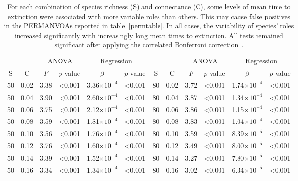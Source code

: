 \documentclass[12pt]{article}
\begin{document}
	\begin{table}[h!]
		\caption{For each combination of species richness (S) and connectance (C), some levels of mean time to extinction were associated with more variable roles than others. This may cause false positives in the PERMANVOAs reported in table~\ref{permtable}. In all cases, the variability of species' roles increased significantly with increasingly long mean times to extinction. All tests remained significant after applying the correlated Bonferroni correction~\citep{Drezner2016}.}
		\label{disptable}
		\footnotesize
		\begin{tabular}{c c | c c| c c ||c c | c c | c c |}
			&		&	\multicolumn{2}{c|}{ANOVA}	&\multicolumn{2}{c||}{Regression} 			& & & 	\multicolumn{2}{c|}{ANOVA}		 	&	 \multicolumn{2}{c|}{Regression} 			\\
            S	&	C	&	$F$	&	$p$-value	&	$\beta$	&	$p$-value	&	S	&	C	&	$F$	&	$p$-value	&	$\beta$	&	$p$-value	\\
			\hline
        50	&	0.02	&	3.38	&	\textless0.001	&	3.36$\times10^{-4}$	&	\textless0.001	&	80	&	0.02	&	3.72	&	\textless0.001	&	1.74$\times10^{-4}$	&	\textless0.001	\\
        50	&	0.04	&	3.90	&	\textless0.001	&	2.60$\times10^{-4}$	&	\textless0.001	&	80	&	0.04	&	3.87	&	\textless0.001	&	1.34$\times10^{-4}$	&	\textless0.001	\\
        50	&	0.06	&	3.75	&	\textless0.001	&	2.12$\times10^{-4}$	&	\textless0.001	&	80	&	0.06	&	3.86	&	\textless0.001	&	1.15$\times10^{-4}$	&	\textless0.001	\\
        50	&	0.08	&	3.59	&	\textless0.001	&	1.81$\times10^{-4}$	&	\textless0.001	&	80	&	0.08	&	3.83	&	\textless0.001	&	1.04$\times10^{-4}$	&	\textless0.001	\\
        50	&	0.10	&	3.56	&	\textless0.001	&	1.76$\times10^{-4}$	&	\textless0.001	&	80	&	0.10	&	3.59	&	\textless0.001	&	8.39$\times10^{-5}$	&	\textless0.001	\\
        50	&	0.12	&	3.76	&	\textless0.001	&	1.60$\times10^{-4}$	&	\textless0.001	&	80	&	0.12	&	3.49	&	\textless0.001	&	8.00$\times10^{-5}$	&	\textless0.001	\\
        50	&	0.14	&	3.39	&	\textless0.001	&	1.52$\times10^{-4}$	&	\textless0.001	&	80	&	0.14	&	3.27	&	\textless0.001	&	7.80$\times10^{-5}$	&	\textless0.001	\\
        50	&	0.16	&	3.34	&	\textless0.001	&	1.34$\times10^{-4}$	&	\textless0.001	&	80	&	0.16	&	3.02	&	\textless0.001	&	6.34$\times10^{-5}$	&	\textless0.001	\\

\end{tabular}
\end{table}
\end{document}
